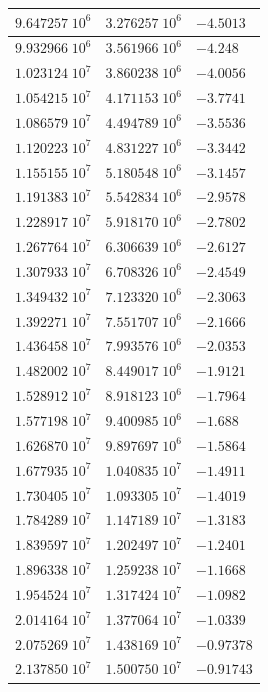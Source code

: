 \documentclass[10pt,a4paper]{book}
\begin{document}
\begin{tabular}{|l|l|l|}
$9.647257\;10^6$ & $3.276257\;10^6$ & $-4.5013$ \\
\hline
$9.932966\;10^6$ & $3.561966\;10^6$ & $-4.248$ \\
\hline
$1.023124\;10^7$ & $3.860238\;10^6$ & $-4.0056$ \\
\hline
$1.054215\;10^7$ & $4.171153\;10^6$ & $-3.7741$ \\
\hline
$1.086579\;10^7$ & $4.494789\;10^6$ & $-3.5536$ \\
\hline
$1.120223\;10^7$ & $4.831227\;10^6$ & $-3.3442$ \\
\hline
$1.155155\;10^7$ & $5.180548\;10^6$ & $-3.1457$ \\
\hline
$1.191383\;10^7$ & $5.542834\;10^6$ & $-2.9578$ \\
\hline
$1.228917\;10^7$ & $5.918170\;10^6$ & $-2.7802$ \\
\hline
$1.267764\;10^7$ & $6.306639\;10^6$ & $-2.6127$ \\
\hline
$1.307933\;10^7$ & $6.708326\;10^6$ & $-2.4549$ \\
\hline
$1.349432\;10^7$ & $7.123320\;10^6$ & $-2.3063$ \\
\hline
$1.392271\;10^7$ & $7.551707\;10^6$ & $-2.1666$ \\
\hline
$1.436458\;10^7$ & $7.993576\;10^6$ & $-2.0353$ \\
\hline
$1.482002\;10^7$ & $8.449017\;10^6$ & $-1.9121$ \\
\hline
$1.528912\;10^7$ & $8.918123\;10^6$ & $-1.7964$ \\
\hline
$1.577198\;10^7$ & $9.400985\;10^6$ & $-1.688$ \\
\hline
$1.626870\;10^7$ & $9.897697\;10^6$ & $-1.5864$ \\
\hline
$1.677935\;10^7$ & $1.040835\;10^7$ & $-1.4911$ \\
\hline
$1.730405\;10^7$ & $1.093305\;10^7$ & $-1.4019$ \\
\hline
$1.784289\;10^7$ & $1.147189\;10^7$ & $-1.3183$ \\
\hline
$1.839597\;10^7$ & $1.202497\;10^7$ & $-1.2401$ \\
\hline
$1.896338\;10^7$ & $1.259238\;10^7$ & $-1.1668$ \\
\hline
$1.954524\;10^7$ & $1.317424\;10^7$ & $-1.0982$ \\
\hline
$2.014164\;10^7$ & $1.377064\;10^7$ & $-1.0339$ \\
\hline
$2.075269\;10^7$ & $1.438169\;10^7$ & $-0.97378$ \\
\hline
$2.137850\;10^7$ & $1.500750\;10^7$ & $-0.91743$ \\

\end{tabular}
\end{document}
